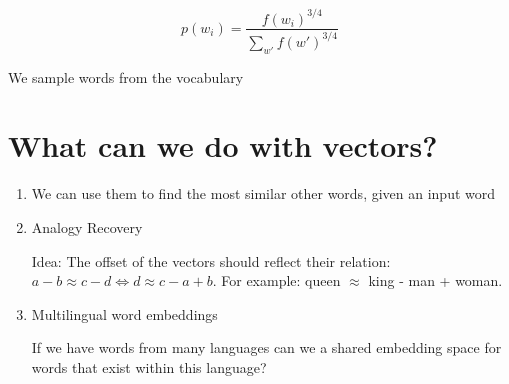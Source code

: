 \documentclass[11pt]{article}
\begin{document}
\begin{equation*}
    p(w_i) = \frac{f(w_i)^{3/4}}{\sum_{w'}f(w')^{3/4}}
\end{equation*}

We sample words from the vocabulary

\section{What can we do with vectors?}

\begin{enumerate}
    \item We can use them to find the most similar other words, given an input word
    \item Analogy Recovery

    Idea: The offset of the vectors should reflect their relation: $a-b \approx c -d \iff d \approx c - a + b$. For example: queen $\approx$ king - man + woman.

    \item Multilingual word embeddings
    
    If we have words from many languages can we a shared embedding space for words that exist within this language?
\end{enumerate}

\printbibliography
\end{document}
